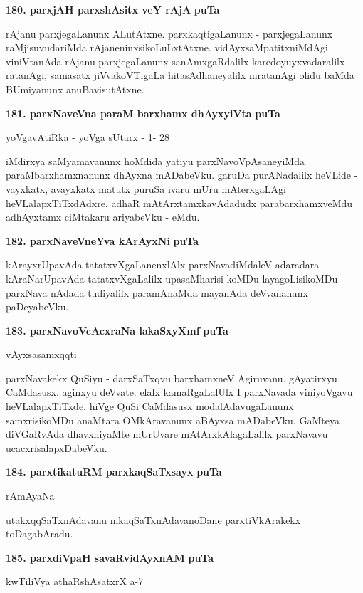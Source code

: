 \medskip
\noindent
\textbf{180. parxjAH parxshAsitx veY rAjA} \hfill{\bf puTa \pageref{92c}}

\smallskip
rAjanu parxjegaLanunx ALutAtxne. parxkaqtigaLanunx - parxjegaLanunx raMjisuvudariMda rAjaneninxsikoLuLxtAtxne. vidAyxsaMpatitxniMdAgi viniVtanAda rAjanu parxjegaLanunx sanAmxgaRdalilx karedoyuyxvadaralilx ratanAgi, samasatx jiVvakoVTigaLa hitasAdhaneyalilx niratanAgi olidu baMda BUmiyanunx anuBavisutAtxne.

\eject

\noindent
\textbf{181. parxNaveVna paraM barxhamx dhAyxyiVta} \hfill{\bf puTa \pageref{147c}}

\hfill{yoVgavAtiRka - yoVga sUtarx - 1- 28}

\smallskip
iMdirxya saMyamavanunx hoMdida yatiyu parxNavoVpAsaneyiMda paraMbarxhamxnanunx dhAyxna mADabeVku. garuDa purANadalilx heVLide - vayxkatx, avayxkatx matutx puruSa ivaru mUru mAterxgaLAgi heVLalapxTiTxdAdxre. adhaR mAtArxtamxkavAdadudx parabarxhamxveMdu adhAyxtamx ciMtakaru ariyabeVku - eMdu.


\medskip
\noindent
\textbf{182. parxNaveVneYva kArAyxNi} \hfill{\bf puTa \pageref{150a}}

\smallskip
kArayxrUpavAda tatatxvXgaLanenxlAlx parxNavadiMdaleV adaradara kAraNarUpavAda tatatxvXgaLalilx upasaMharisi koMDu-layagoLisikoMDu parxNava nAdada tudiyalilx paramAnaMda mayanAda deVvananunx paDeyabeVku.

\medskip
\noindent
\textbf{183. parxNavoVcAcxraNa lakaSxyXmf} \hfill{\bf puTa \pageref{147d}}

\hfill{vAyxsasamxqqti}

\smallskip
parxNavakekx QuSiyu - darxSaTxqvu barxhamxneV Agiruvanu. gAyatirxyu CaMdasusx. aginxyu deVvate. elalx kamaRgaLalUlx I parxNavada viniyoVgavu heVLalapxTiTxde. hiVge QuSi CaMdasusx modalAdavugaLanunx samxrisikoMDu anaMtara OMkAravanunx aBAyxsa mADabeVku. GaMteya diVGaRvAda dhavxniyaMte mUrUvare mAtArxkAlagaLalilx parxNavavu ucacxrisalapxDabeVku.

\medskip
\noindent
\textbf{184. parxtikatuRM parxkaqSaTxsayx} \hfill{\bf puTa \pageref{223a}}

\hfill{rAmAyaNa}

\smallskip
utakxqqSaTxnAdavanu nikaqSaTxnAdavanoDane parxtiVkArakekx toDagabAradu.

\medskip
\noindent
\textbf{185. parxdiVpaH savaRvidAyxnAM} \hfill{\bf puTa \pageref{89b}}

\hfill{kwTiliVya athaRshAsatxrX a-7}

